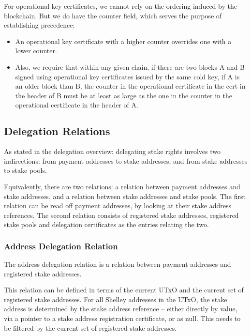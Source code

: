 \documentclass[11pt,a4paper,dvipsnames,twosided]{article}
\begin{document}
For operational key certificates, we cannot rely on the ordering induced by
the blockchain. But we do have the counter field, which serves the
purpose of establishing precedence:

\begin{itemize}
\item
  An operational key certificate with a higher counter overrides one with a
  lower counter.
\item
  Also, we require that within any given chain, if there are two blocks A and B
  signed using operational key certificates issued by the same cold key, if A is
  an older block than B, the counter in the operational certificate in the cert
  in the header of B must be at least as large as the one in the counter in the
  operational certificate in the header of A.
\end{itemize}

\subsection{Delegation Relations}
\label{delegation-relations}

As stated in the delegation overview: delegating stake rights involves two
indirections: from payment addresses to stake addresses, and from stake
addresses to stake pools.

Equivalently, there are two relations: a relation between payment addresses and
stake addresses, and a relation between stake addresses and stake pools. The
first relation can be read off payment addresses, by looking at their stake
address references. The second relation consists of registered stake addresses,
registered stake pools and delegation certificates as the entries relating the
two.

\subsubsection{Address Delegation Relation}
\label{address-delegation-relation}

The address delegation relation is a relation between payment addresses and
registered stake addresses.

This relation can be defined in terms of the current UTxO and the current set of
registered stake addresses. For all Shelley addresses in the UTxO, the stake
address is determined by the stake address reference -- either directly by
value, via a pointer to a stake address registration certificate, or as null.
This needs to be filtered by the current set of registered stake addresses.
\end{document}
